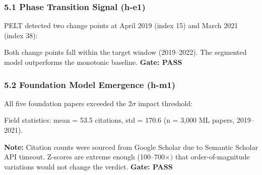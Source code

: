 
\subsubsection{5.1 Phase Transition Signal (h-e1)}

PELT detected two change points at April 2019 (index 15) and March 2021 (index 38):

\begin{table}[htbp]
\centering
{}
\end{table}

Both change points fall within the target window (2019--2022). The segmented model outperforms the monotonic baseline. \textbf{Gate: PASS}

\subsubsection{5.2 Foundation Model Emergence (h-m1)}

All five foundation papers exceeded the $2\sigma$ impact threshold:

\begin{table}[htbp]
\centering
{}
\end{table}

Field statistics: mean = 53.5 citations, std = 170.6 (n = 3,000 ML papers, 2019--2021).

\textbf{Note:} Citation counts were sourced from Google Scholar due to Semantic Scholar API timeout. Z-scores are extreme enough (100--$700\times )$ that order-of-magnitude variations would not change the verdict. \textbf{Gate: PASS}


